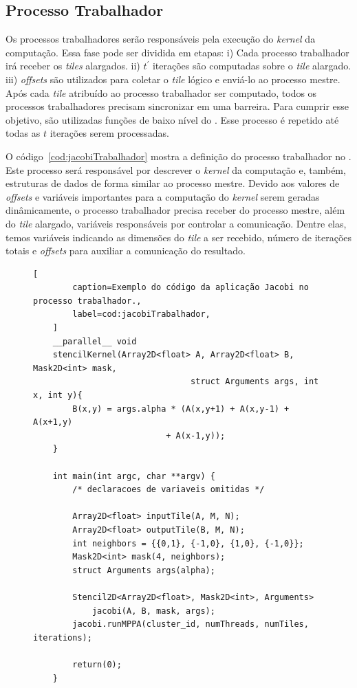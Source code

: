 \subsection{Processo Trabalhador}
Os processos trabalhadores serão responsáveis pela
execução do \textit{kernel} da computação. Essa fase pode ser dividida em
etapas: i) Cada processo trabalhador irá receber os \textit{tiles} alargados.
ii) $t^\prime$ iterações são computadas sobre o \textit{tile} alargado. iii)
\textit{offsets} são utilizados para coletar o \textit{tile} lógico e enviá-lo
ao processo mestre. Após cada \textit{tile}
atribuído ao processo trabalhador ser computado, todos os processos
trabalhadores precisam sincronizar em uma barreira. Para cumprir esse objetivo,
são utilizadas funções de baixo nível do \mppa. Esse processo é repetido até
todas as $t$ iterações serem processadas.

O código~\ref{cod:jacobiTrabalhador} mostra a definição do processo trabalhador
no \mppa. Este processo será responsável por descrever o \textit{kernel} da
computação e, também, estruturas de dados de forma similar ao processo mestre.
Devido aos valores de \textit{offsets} e variáveis importantes para a computação
do \textit{kernel} serem geradas dinâmicamente, o processo trabalhador precisa
receber do processo mestre, além do \textit{tile} alargado, variáveis
responsáveis por controlar a comunicação. Dentre elas, temos variáveis indicando
as dimensões do \textit{tile} a ser recebido, número de iterações totais e
\textit{offsets} para auxiliar a comunicação do resultado.


\begin{figure}[!h]
	\begin{lstlisting}[
		caption=Exemplo do código da aplicação Jacobi no processo trabalhador.,
		label=cod:jacobiTrabalhador,
	]
	__parallel__ void
	stencilKernel(Array2D<float> A, Array2D<float> B, Mask2D<int> mask,
								struct Arguments args, int x, int y){
		B(x,y) = args.alpha * (A(x,y+1) + A(x,y-1) + A(x+1,y)
                           + A(x-1,y));
	}

	int main(int argc, char **argv) {
		/* declaracoes de variaveis omitidas */

		Array2D<float> inputTile(A, M, N);
		Array2D<float> outputTile(B, M, N);
		int neighbors = {{0,1}, {-1,0}, {1,0}, {-1,0}};
		Mask2D<int> mask(4, neighbors);
		struct Arguments args(alpha);

		Stencil2D<Array2D<float>, Mask2D<int>, Arguments>
			jacobi(A, B, mask, args);
		jacobi.runMPPA(cluster_id, numThreads, numTiles, iterations);

		return(0);
	}
\end{lstlisting}
\end{figure}

